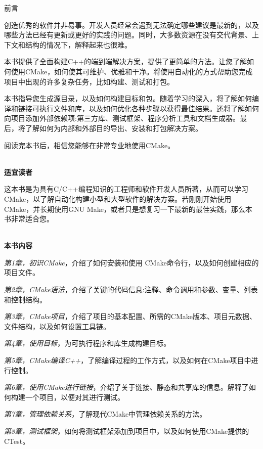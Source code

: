 \begin{flushright}
 前言
\end{flushright}

创造优秀的软件并非易事。开发人员经常会遇到无法确定哪些建议是最新的，以及哪些方法已经有更新或更好的实践的问题。同时，大多数资源在没有交代背景、上下文和结构的情况下，解释起来也很难。

本书提供了全面构建C++的端到端解决方案，提供了更简单的方法。让您了解如何使用CMake，如何使其可维护、优雅和干净。将使用自动化的方式帮助您完成项目中出现的许多复杂任务，比如构建、测试和打包。

本书指导您生成源目录，以及如何构建目标和包。随着学习的深入，将了解如何编译和链接可执行文件和库，以及如何优化各种步骤以获得最佳结果。还将了解如何向项目添加外部依赖项:第三方库、测试框架、程序分析工具和文档生成器。最后，将了解如何为内部和外部目的导出、安装和打包解决方案。

阅读完本书后，相信您能够在非常专业地使用CMake。

\hspace*{\fill} \\ %
\textbf{适宜读者}

这本书是为具有C/C++编程知识的工程师和软件开发人员所著，从而可以学习CMake，以了解自动化构建小型和大型软件的解决方案。若刚刚开始使用CMake，并长期使用GNU Make，或者只是想复习一下最新的最佳实践，那么本书非常适合您。

\hspace*{\fill} \\ %
\textbf{本书内容}

\textit{第1章，初识CMake}，介绍了如何安装和使用 CMake命令行，以及如何创建相应的项目文件。

\textit{第2章，CMake语法}，介绍了关键的代码信息:注释、命令调用和参数、变量、列表和控制结构。

\textit{第3章，CMake项目}，介绍了项目的基本配置、所需的CMake版本、项目元数据、文件结构，以及如何设置工具链。

\textit{第4章，使用目标}，为可执行程序和库生成构建目标。

\textit{第5章，CMake编译C++}，了解编译过程的工作方式，以及如何在CMake项目中进行控制。

\textit{第6章，使用CMake进行链接}，介绍了关于链接、静态和共享库的信息。解释了如何构建一个项目，以便对其进行测试。

\textit{第7章，管理依赖关系}，了解现代CMake中管理依赖关系的方法。

\textit{第8章，测试框架}，如何将测试框架添加到项目中，以及如何使用CMake提供的CTest。

